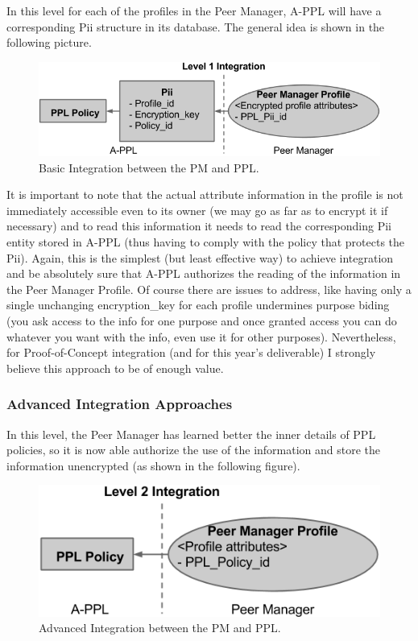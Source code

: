In this level for each of the profiles in the Peer Manager, A-PPL will have a corresponding Pii structure in its database. The general idea is shown in the following picture.

\begin{figure}[htb!]
\centering
\includegraphics[width=0.8\linewidth]{figures/pm-ppl-lv1.png}
\caption{Basic Integration between the PM and PPL.}
\label{fig:pm-ppl-lv1.png}
\end{figure}

It is important to note that the actual attribute information in the profile is not immediately accessible even to its owner (we may go as far as to encrypt it if necessary) and to read this information it needs to read the corresponding Pii entity stored in A-PPL (thus having to comply with the policy that protects the Pii).
Again, this is the simplest (but least effective way) to achieve integration and be absolutely sure that A-PPL authorizes the reading of the information in the Peer Manager Profile.
Of course there are issues to address, like having only a single unchanging encryption\_key for  each profile undermines purpose biding (you ask access to the info for one purpose and once granted access you can do whatever you want with the info, even use it for other purposes). Nevertheless, for Proof-of-Concept integration (and for this year's deliverable) I strongly believe this approach to be of enough value.

\subsubsection{Advanced Integration Approaches}
In this level, the Peer Manager has learned better the inner details of PPL policies, so it is now able authorize the use of the information and store the information unencrypted (as shown in the following figure). 

\begin{figure}[htb!]
\centering
\includegraphics[width=0.6\linewidth]{figures/pm-ppl-lv2.png}
\caption{Advanced Integration between the PM and PPL.}
\label{fig:pm-ppl-lv2.png}
\end{figure}

